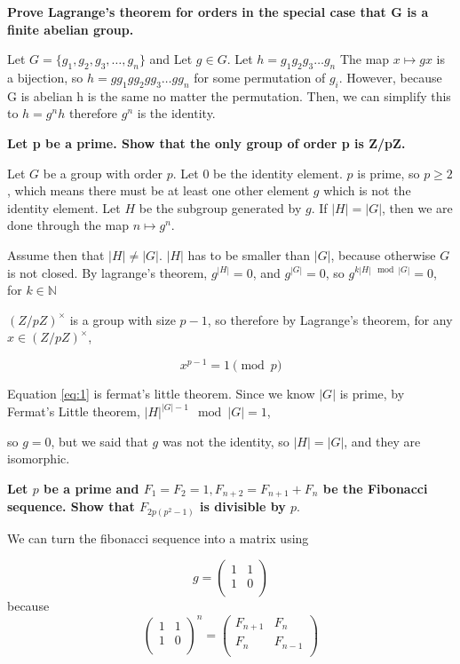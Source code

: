 \documentclass{article}
\begin{document}
\textbf{Prove Lagrange’s theorem for orders in the special case that G is a finite
abelian group.}


Let $G = \{g_1, g_2, g_3, \dots, g_n\}$ and 
Let $g \in G$. Let $h = g_1g_2g_3\dots g_n $  The map $x \mapsto gx $ is a bijection,
so $h = g g_1 g g_2 g g_3 \dots g g_n$ for some permutation of $g_i$.  However,  because G is abelian
h is the same no matter the permutation.  Then, we can simplify this to
$h = g^n h$ therefore $g^n$ is the identity.

\textbf{Let p be a prime. Show that the only group of order p is Z/pZ.}


Let $G$ be a group with order $p$. Let $0$ be the identity element. $p$ is prime, so $p \ge 2$, which means there must
be at least one other element $g$ which is not the identity element. Let $H$ be the subgroup
generated by $g$. If $|H| = |G|$, then we are done through the map $n \mapsto g^n$. 

Assume then that $|H| \ne |G|$. $|H|$ has to be smaller than $|G|$, because otherwise $G$ is not closed.  
By lagrange's theorem,  $g^{|H|} = 0$, and $g^{|G|} = 0$, so $g ^{k |H| \mod |G|} = 0$, for $k \in \mathbb{N}$


\((Z / pZ)^{\times}\) is a group with size \(p - 1\), so therefore by Lagrange's theorem, for any
\(x \in (Z / pZ)^{\times}\),

\begin{equation}
\label{eq:1}
x^{p-1} = 1 \pmod p
\end{equation}

Equation \ref{eq:1} is fermat's little theorem.
Since we know $|G|$ is prime, by Fermat's Little theorem, $|H|^{|G| - 1} \mod |G| = 1$,

so $g = 0$, but we said that $g$ was not the identity, so $|H| = |G|$, and they 
are isomorphic.


\textbf{Let $p$ be a prime and $F_1 = F_2 = 1, F_{n+2} = F_{n+1} + F_n$
 be the Fibonacci sequence. Show that $F_{2p(p^2-1)}$ is divisible by $p$}.


We can turn the fibonacci sequence into a matrix using


\[
g = 
\begin{pmatrix}
1 & 1 \\
1 & 0 \\
\end{pmatrix} 
\]
because 
\[
\begin{pmatrix}
1 & 1 \\
1 & 0 \\
\end{pmatrix}^n = 
\begin{pmatrix}
F_{n+1} & F_{n} \\
F_n & F_{n -1 }\\
\end{pmatrix}
\]
\end{document}
